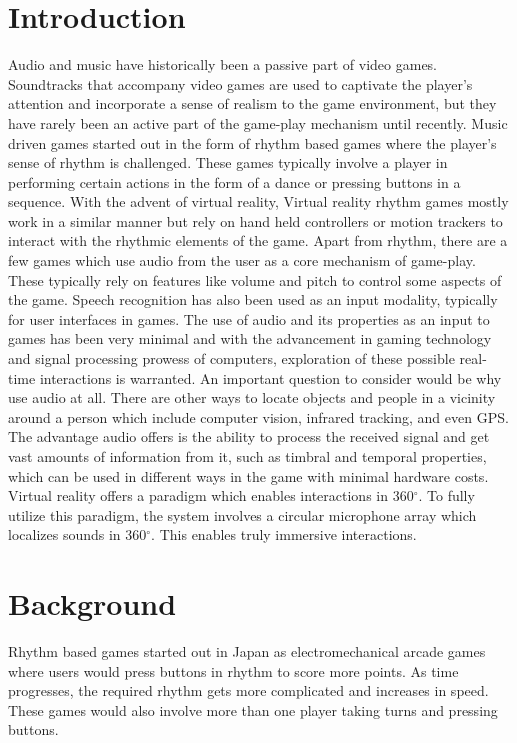 \documentclass[convention]{aesconf}
\begin{document}
\section{Introduction}
Audio and music have historically been a passive part of video games. Soundtracks that accompany video games are used to captivate the player's attention and incorporate a sense of realism to the game environment, but they have rarely been an active part of the game-play mechanism until recently.
Music driven games started out in the form of rhythm based games where the player's sense of rhythm is challenged. These games typically involve a player in performing certain actions in the form of a dance or pressing buttons in a sequence. With the advent of virtual reality, 
Virtual reality rhythm games mostly work in a similar manner but rely on hand held controllers or motion trackers to interact with the rhythmic elements of the game.
Apart from rhythm, there are a few games which use audio from the user as a core mechanism of game-play. These typically rely on features like volume and pitch to control some aspects of the game.
Speech recognition has also been used as an input modality, typically for user interfaces in games.
The use of audio and its properties as an input to games has been very minimal and with the advancement in gaming technology and signal processing prowess of computers, exploration of these possible real-time interactions is warranted.
An important question to consider would be why use audio at all. There are other ways to locate objects and people in a vicinity around a person which include computer vision, infrared tracking, and even GPS. The advantage audio offers is the ability to process the received signal and get vast amounts of information from it, such as timbral and temporal properties, which can be used in different ways in the game with minimal hardware costs.
Virtual reality offers a paradigm which enables interactions in 360$^\circ$. To fully utilize this paradigm, the system involves a circular microphone array which localizes sounds in 360$^\circ$. This enables truly immersive interactions.
 

\section{Background}
Rhythm based games started out in Japan as electromechanical arcade games where users would press buttons in rhythm to score more points. As time progresses, the required rhythm gets more complicated and increases in speed. These games would also involve more than one player taking turns and pressing buttons.
\end{document}
